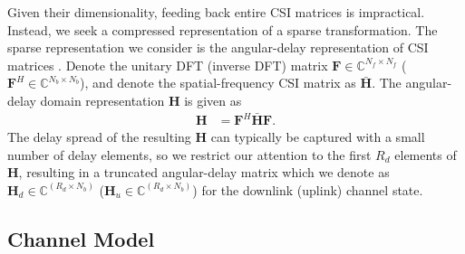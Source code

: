 Given their dimensionality, feeding back entire CSI matrices is impractical. Instead, we seek a compressed representation of a sparse transformation. The sparse representation we consider is the angular-delay representation of CSI matrices \cite{ref:sayeed2002deconstructing}. Denote the unitary DFT (inverse DFT) matrix $\mathbf F \in \mathbb C^{N_f \times N_f}$ ($\mathbf F^H \in \mathbb C^{N_b \times N_b}$), and denote the spatial-frequency CSI matrix as $\bar{\mathbf H}$. The angular-delay domain representation $\mathbf H$ is given as %
\begin{align*}
	\mathbf H &= \mathbf F^H \bar{\mathbf H} \mathbf F.
\end{align*}
The delay spread of the resulting $\mathbf H$ can typically be captured with a small number of delay elements, so we restrict our attention to the first $R_d$ elements of $\mathbf H$, resulting in a truncated angular-delay matrix which we denote as $\mathbf H_d \in \mathbb C^{(R_d\times N_b)}$ ($\mathbf H_u \in \mathbb C^{(R_d\times N_b)}$) for the downlink (uplink) channel state.

\subsection{Channel Model}
\label{sect:channel_model}

